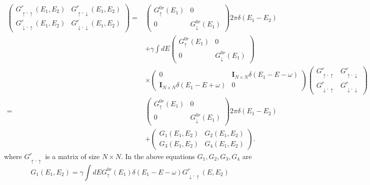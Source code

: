 \documentclass[11pt,a4paper]{article}
\begin{document}
\begin{equation}
\begin{split}
\left(\begin{array}{cc}
G_{\uparrow,\uparrow}^{r}(E_{1},E_{2}) & G_{\uparrow,\downarrow}^{r}(E_{1},E_{2}) \\
G_{\downarrow,\uparrow}^{r}(E_{1},E_{2}) & G_{\downarrow,\downarrow}^{r}(E_{1},E_{2})
\end{array}\right) = &
\left(\begin{array}{cc}
G_{\uparrow}^{0r}(E_{1}) &0 \\
0 & G_{\downarrow}^{0r}(E_{1})
\end{array}\right) 2\pi\delta(E_{1}-E_{2})\\
&+ \gamma\int dE\left(\begin{array}{cc}
G_{\uparrow}^{0r}(E_{1}) &0 \\
0 & G_{\downarrow}^{0r}(E_{1})
\end{array}\right) \\
&\times
\left(\begin{array}{cc}
0 & \mathbf{I}_{N\times N}\delta(E_{1}-E-\omega) \\
\mathbf{I}_{N\times N}\delta(E_{1}-E+\omega) & 0
\end{array}\right)
 \left(\begin{array}{cc}
G_{\uparrow,\uparrow}^{r} & G_{\uparrow,\downarrow}^{r} \\
G_{\downarrow,\uparrow}^{r} & G_{\downarrow,\downarrow}^{r}
\end{array}\right) \\
=&\left(\begin{array}{cc}
G_{\uparrow}^{0r}(E_{1}) &0 \\
0 & G_{\downarrow}^{0r}(E_{1})
\end{array}\right) 2\pi\delta(E_{1}-E_{2})\\
&+ \left(\begin{array}{cc}
G_{1}(E_{1},E_{2}) & G_{2}(E_{1},E_{2}) \\
G_{3}(E_{1},E_{2}) & G_{4}(E_{1},E_{2})
\end{array}\right).
\end{split}
\end{equation}
where $G_{\uparrow,\uparrow}^{r}$ is a matrix of size $N\times N$. In the above equations $G_{1}, G_{2}, G_{3}, G_{4}$ are
\begin{equation}
G_{1}(E_{1},E_{2}) = \gamma \int dE G_{ \uparrow}^{0r}\left(E_{1}\right) \delta(E_{1}-E-\omega) G_{ \downarrow, \uparrow}^{r}(E,E_{2})
\end{equation}
\end{document}
